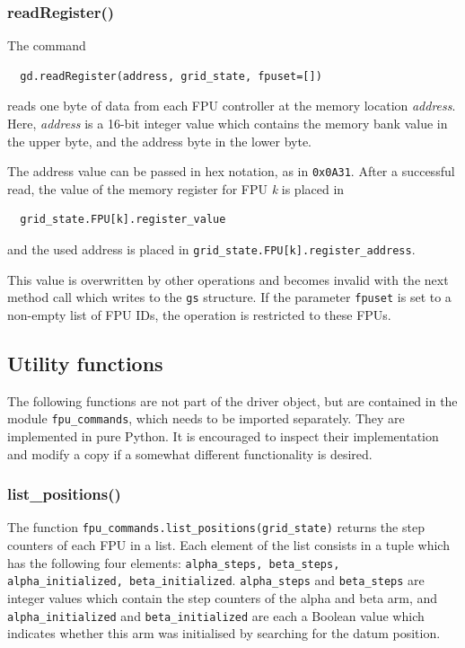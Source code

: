 \documentclass[11pt,a4paper]{scrartcl}
\begin{document}
\subsubsection{readRegister()}
\label{sec:readregister}

The command

\begin{verbatim}
  gd.readRegister(address, grid_state, fpuset=[])
\end{verbatim}
reads one byte of data from each FPU controller
at the memory location \emph{address}. Here,
\emph{address} is a 16-bit integer value
which contains the memory bank value in the
upper byte, and the address byte in the lower byte.

The address value can be passed in hex notation,
as in \texttt{0x0A31}. After a successful read,
the value of the memory register for FPU \emph{k}
is placed in

\begin{verbatim}
  grid_state.FPU[k].register_value
\end{verbatim}
and the used address is placed in
\verb+grid_state.FPU[k].register_address+.


This value is overwritten by other operations and becomes invalid with
the next method call which writes to the \texttt{gs} structure.  If
the parameter \texttt{fpuset} is set to a non-empty list of FPU IDs,
the operation is restricted to these FPUs.


\subsection{Utility functions}

The following functions are not part of the driver object, but are
contained in the module \texttt{fpu\_commands}, which needs to be
imported separately. They are implemented in pure Python. It is
encouraged to inspect their implementation and modify a copy if a
somewhat different functionality is desired.

\subsubsection{list\_positions()}
\label{sec:listpositions}
 
The function \texttt{fpu\_commands.list\_positions(grid\_state)}
returns the step counters of each FPU in a list.  Each element of the
list consists in a tuple which has the following four elements:
\texttt{alpha\_steps, beta\_steps, alpha\_initialized,
  beta\_initialized}. \texttt{alpha\_steps} and \texttt{beta\_steps}
are integer values which contain the step counters of the alpha and
beta arm, and \texttt{alpha\_initialized} and
\texttt{beta\_initialized} are each a Boolean value which indicates
whether this arm was initialised by searching for the datum position.
\end{document}
